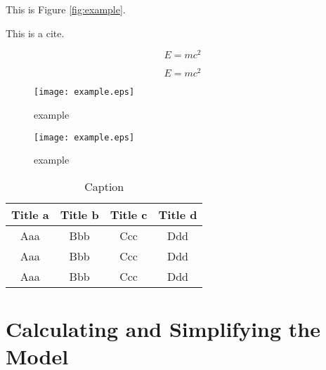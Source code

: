 \documentclass{main}  %
\begin{document}
This is Figure \eqref{fig:example}.  %

This is a cite\cite{vaswani2017attention}.  %

\begin{equation}  %
E = mc^2 \label{aa}  %
\end{equation}  %

\begin{equation}  %
\nonumber %
E = mc^2
\end{equation}  %

\begin{figure}[h]  %
\centering  %
\begin{minipage}[c]{0.48\textwidth}  %
\centering  %
\texttt{[image: example.eps]}  %
\caption{example} \label{fig:example}  %
\end{minipage}  %
\hspace{0.02\textwidth}
\begin{minipage}[c]{0.48\textwidth}  %
\centering  %
\texttt{[image: example.eps]}  %
\caption{example} \label{fig:example}  %
\end{minipage}  %
\end{figure}  %

\begin{table}[!t]  %
\caption{Caption}  %
\label{tab1}  %
\tabcolsep 42pt %
\begin{tabular*}{\textwidth}{cccc}  %
\toprule  %
Title a & Title b & Title c & Title d \\
\midrule  %
Aaa & Bbb & Ccc & Ddd \\
Aaa & Bbb & Ccc & Ddd \\
Aaa & Bbb & Ccc & Ddd \\
\bottomrule  %
\end{tabular*}  %
\end{table}  %

\section{Calculating and Simplifying the Model}  %
\end{document}
